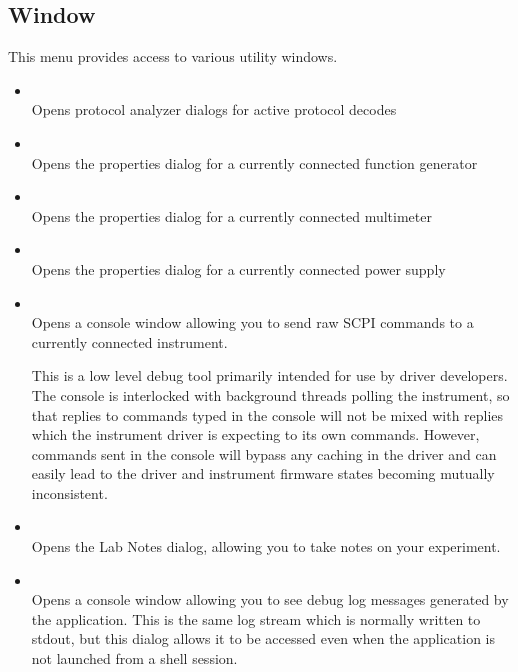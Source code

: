 \subsection{Window}

This menu provides access to various utility windows.

\begin{itemize}

\item {}\\
Opens protocol analyzer dialogs for active protocol decodes

\item {}\\
Opens the properties dialog for a currently connected function generator

\item {}\\
Opens the properties dialog for a currently connected multimeter

\item {}\\
Opens the properties dialog for a currently connected power supply

\item {}\\
Opens a console window allowing you to send raw SCPI commands to a currently connected instrument.

This is a low level debug tool primarily intended for use by driver developers. The console is interlocked with
background threads polling the instrument, so that replies to commands typed in the console will not be mixed with
replies which the instrument driver is expecting to its own commands. However, commands sent in the console will bypass
any caching in the driver and can easily lead to the driver and instrument firmware states becoming mutually
inconsistent.

\item {}\\
Opens the Lab Notes dialog, allowing you to take notes on your experiment.

\item {}\\
Opens a console window allowing you to see debug log messages generated by the application. This is the same log stream
which is normally written to stdout, but this dialog allows it to be accessed even when the application is not launched
from a shell session.


\end{itemize}
